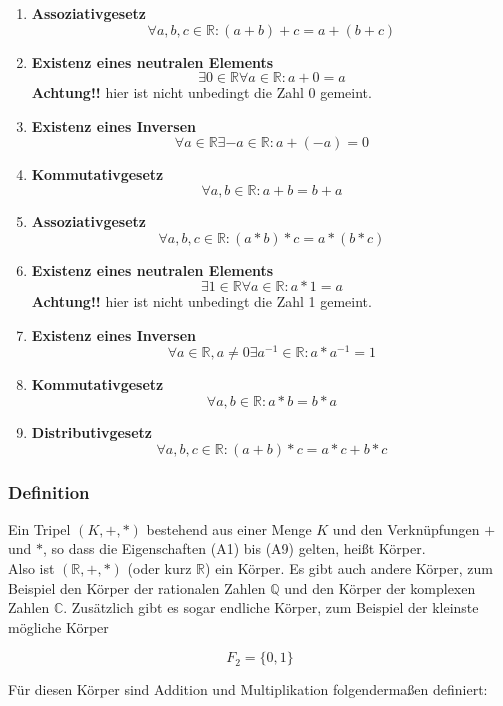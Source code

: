 \documentclass{article}
\begin{document}
\begin{enumerate}[label=(A\arabic*)]
\item \textbf{Assoziativgesetz}
  \[
    \forall a,b,c \in \mathbb{R} \colon (a + b) + c = a + (b + c)
  \]
\item \textbf{Existenz eines neutralen Elements}
  \[
    \exists 0 \in \mathbb{R} \forall a \in \mathbb{R} \colon a + 0 = a
  \]
  \textbf{Achtung!!} hier ist nicht unbedingt die Zahl 0 gemeint.
\item \textbf{Existenz eines Inversen}
  \[
    \forall a \in \mathbb{R} \exists -a \in \mathbb{R} \colon a + (-a) = 0
  \]
\item \textbf{Kommutativgesetz}
  \[
    \forall a,b \in \mathbb{R} \colon a + b = b + a
  \]
\item \textbf{Assoziativgesetz}
  \[
    \forall a,b,c \in \mathbb{R} \colon (a * b) * c = a * (b * c)
  \]
\item \textbf{Existenz eines neutralen Elements}
  \[
    \exists 1 \in \mathbb{R} \forall a \in \mathbb{R} \colon a * 1 = a
  \]
  \textbf{Achtung!!} hier ist nicht unbedingt die Zahl 1 gemeint.
\item \textbf{Existenz eines Inversen}
  \[
    \forall a \in \mathbb{R}, a \ne 0 \exists a^{-1} \in \mathbb{R} \colon a * a^{-1} = 1
  \]
\item \textbf{Kommutativgesetz}
  \[
    \forall a,b \in \mathbb{R} \colon a * b = b * a
  \]
\item \textbf{Distributivgesetz}
  \[
    \forall a,b,c \in \mathbb{R} \colon (a + b) * c = a * c + b * c
  \]
\end{enumerate}

\subsubsection{Definition}

Ein Tripel $(K,+,*)$ bestehend aus einer Menge $K$ und den Verknüpfungen $+$ und $*$, so dass
die Eigenschaften (A1) bis (A9) gelten, heißt Körper. \\

Also ist $(\mathbb{R},+,*)$ (oder kurz $\mathbb{R}$) ein Körper.
Es gibt auch andere Körper, zum Beispiel den Körper der rationalen Zahlen $\mathbb{Q}$ und den Körper
der komplexen Zahlen $\mathbb{C}$.
Zusätzlich gibt es sogar endliche Körper, zum Beispiel der kleinste mögliche Körper

\[
  F_2 = \{ 0, 1 \}
\]

Für diesen Körper sind Addition und Multiplikation folgendermaßen definiert: \\
\end{document}
